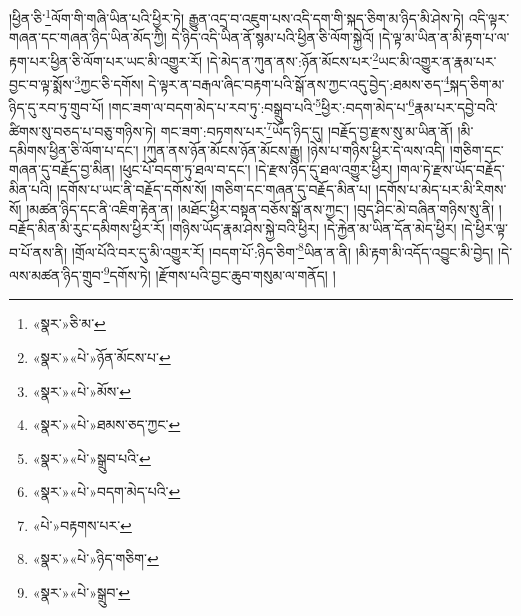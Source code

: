 །ཕྱིན་ཅི་\footnote{«སྣར་»ཅི་མ་}ལོག་གི་གཞི་ཡིན་པའི་ཕྱིར་ཏེ། རྒྱུན་འདྲ་བ་འཇུག་པས་འདི་དག་གི་སྐད་ཅིག་མ་ཉིད་མི་ཤེས་ཏེ། འདི་ལྟར་གཞན་དང་གཞན་ཉིད་ཡིན་མོད་ཀྱི། དེ་ཉིད་འདི་ཡིན་ནོ་སྙམ་པའི་ཕྱིན་ཅི་ལོག་སྐྱེའོ། །དེ་ལྟ་མ་ཡིན་ན་མི་རྟག་པ་ལ་རྟག་པར་ཕྱིན་ཅི་ལོག་པར་ཡང་མི་འགྱུར་རོ། །དེ་མེད་ན་ཀུན་ནས་:ཉོན་མོངས་པར་\footnote{«སྣར་»«པེ་»ཉོན་མོངས་པ་}ཡང་མི་འགྱུར་ན་རྣམ་པར་བྱང་བ་ལྟ་སྨོས་\footnote{«སྣར་»«པེ་»མོས་}ཀྱང་ཅི་དགོས། དེ་ལྟར་ན་བརྒལ་ཞིང་བརྟག་པའི་སྒོ་ནས་ཀྱང་འདུ་བྱེད་:ཐམས་ཅད་\footnote{«སྣར་»«པེ་»ཐམས་ཅད་ཀྱང་}སྐད་ཅིག་མ་ཉིད་དུ་རབ་ཏུ་གྲུབ་པོ། །གང་ཟག་ལ་བདག་མེད་པ་རབ་ཏུ་:བསྒྲུབ་པའི་\footnote{«སྣར་»«པེ་»སྒྲུབ་པའི་}ཕྱིར་:བདག་མེད་པ་\footnote{«སྣར་»«པེ་»བདག་མེད་པའི་}རྣམ་པར་དབྱེ་བའི་ཚིགས་སུ་བཅད་པ་བཅུ་གཉིས་ཏེ། གང་ཟག་:བཏགས་པར་\footnote{«པེ་»བརྟགས་པར་}ཡོད་ཉིད་དུ། །བརྗོད་བྱ་རྫས་སུ་མ་ཡིན་ནོ། །མི་དམིགས་ཕྱིན་ཅི་ལོག་པ་དང་། །ཀུན་ནས་ཉོན་མོངས་ཉོན་མོངས་རྒྱུ། །ཉེས་པ་གཉིས་ཕྱིར་དེ་ལས་འདི། །གཅིག་དང་གཞན་དུ་བརྗོད་བྱ་མིན། །ཕུང་པོ་བདག་ཏུ་ཐལ་བ་དང་། །དེ་རྫས་ཉིད་དུ་ཐལ་འགྱུར་ཕྱིར། །གལ་ཏེ་རྫས་ཡོད་བརྗོད་མིན་པའི། །དགོས་པ་ཡང་ནི་བརྗོད་དགོས་སོ། །གཅིག་དང་གཞན་དུ་བརྗོད་མིན་པ། །དགོས་པ་མེད་པར་མི་རིགས་སོ། །མཚན་ཉིད་དང་ནི་འཇིག་རྟེན་ན། །མཐོང་ཕྱིར་བསྟན་བཅོས་སྒོ་ནས་ཀྱང་། །བུད་ཤིང་མེ་བཞིན་གཉིས་སུ་ནི། །བརྗོད་མིན་མི་རུང་དམིགས་ཕྱིར་རོ། །གཉིས་ཡོད་རྣམ་ཤེས་སྐྱེ་བའི་ཕྱིར། །དེ་རྐྱེན་མ་ཡིན་དོན་མེད་ཕྱིར། །དེ་ཕྱིར་ལྟ་བ་པོ་ནས་ནི། །གྲོལ་པོའི་བར་དུ་མི་འགྱུར་རོ། །བདག་པོ་:ཉིད་ཅིག་\footnote{«སྣར་»«པེ་»ཉིད་གཅིག་}ཡིན་ན་ནི། །མི་རྟག་མི་འདོད་འབྱུང་མི་བྱེད། །དེ་ལས་མཚན་ཉིད་གྲུབ་\footnote{«སྣར་»«པེ་»སྒྲུབ་}དགོས་ཏེ། །རྫོགས་པའི་བྱང་ཆུབ་གསུམ་ལ་གནོད། །
